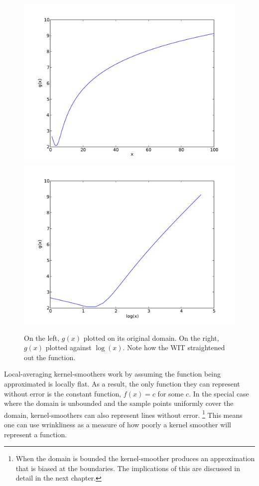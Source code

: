 \begin{figure}[!htb]
    \includegraphics[width=\linewidth]{figs/gp1.pdf}
  \endminipage\hfill
    \includegraphics[width=\linewidth]{figs/gp2.pdf}
  \endminipage
\caption[Wrinkle-Ironing Transform Example]{On the left, $g(x)$ plotted on its
  original domain. On the right, $g(x)$ plotted against $\log(x)$.
  Note how the WIT straightened out the function.}
\end{figure}

Local-averaging kernel-smoothers work by assuming the function being
approximated is locally flat.
As a result, the only function they can represent without error is
the constant function, $f(x) = c$ for some $c$.
In the special case where the domain is unbounded and the sample points uniformly
cover the domain, kernel-smoothers can also represent lines without error.
\footnote{When the domain is bounded the kernel-smoother produces an
approximation that is biased at the boundaries.
The implications of this are discussed in detail in the next chapter.}
This means one can use wrinkliness as a measure of how poorly a
kernel smoother will represent a function.

